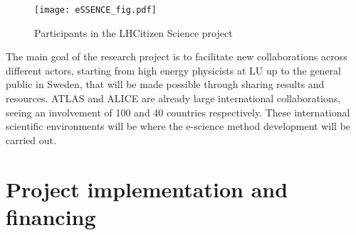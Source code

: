 \documentclass[a4paper,justified]{tufte-handout}
\begin{document}
\begin{wrapfigure}{r}{0.5\textwidth} 
\centering
	\texttt{[image: eSSENCE\_fig.pdf]}
  \caption{Participants in the LHCitizen Science project}
    	\label{fig:Participants}
\end{wrapfigure}

The main goal of the research project is to facilitate new collaborations across different actors, starting from high energy physicists at LU up to the general public in Sweden, that will be made possible through sharing results and resources. ATLAS and ALICE are already large international collaborations, seeing an involvement of 100 and 40 countries respectively. These international scientific environments will be where the e-science method development will be carried out. 









\vspace{-10px}
\section{Project implementation and financing} \label{sec:implementation}
\vspace{-10px}
\end{document}

